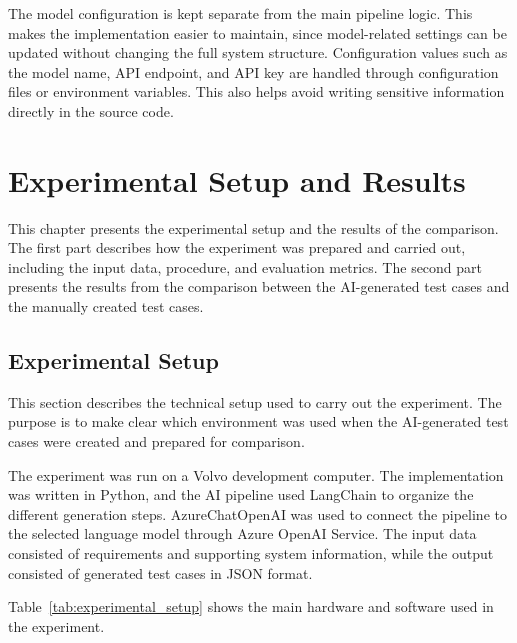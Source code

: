\documentclass[a4paper,12pt]{article}
\begin{document}
The model configuration is kept separate from the main pipeline logic. This makes the implementation easier to maintain, since model-related settings can be updated without changing the full system structure. Configuration values such as the model name, API endpoint, and API key are handled through configuration files or environment variables. This also helps avoid writing sensitive information directly in the source code.

\newpage

\section{Experimental Setup and Results}
\label{experiments}

This chapter presents the experimental setup and the results of the comparison. The first part describes how the experiment was prepared and carried out, including the input data, procedure, and evaluation metrics. The second part presents the results from the comparison between the AI-generated test cases and the manually created test cases.

\subsection{Experimental Setup}
This section describes the technical setup used to carry out the experiment. The purpose is to make clear which environment was used when the AI-generated test cases were created and prepared for comparison.

The experiment was run on a Volvo development computer. The implementation was written in Python, and the AI pipeline used LangChain to organize the different generation steps. AzureChatOpenAI was used to connect the pipeline to the selected language model through Azure OpenAI Service. The input data consisted of requirements and supporting system information, while the output consisted of generated test cases in JSON format.

Table~\ref{tab:experimental_setup} shows the main hardware and software used in the experiment.
\end{document}
